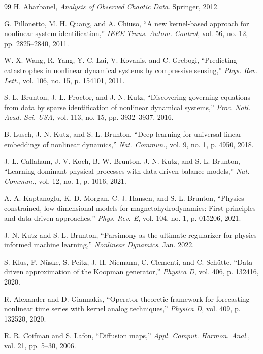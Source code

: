 \documentclass[11pt,a4paper]{article}
\begin{document}
\begin{thebibliography}{99}
H. Abarbanel, \textit{Analysis of Observed Chaotic Data}. Springer, 2012.

G. Pillonetto, M. H. Quang, and A. Chiuso, ``A new kernel-based approach for nonlinear system identification,'' \textit{IEEE Trans. Autom. Control}, vol. 56, no. 12, pp. 2825--2840, 2011.

W.-X. Wang, R. Yang, Y.-C. Lai, V. Kovanis, and C. Grebogi, ``Predicting catastrophes in nonlinear dynamical systems by compressive sensing,'' \textit{Phys. Rev. Lett.}, vol. 106, no. 15, p. 154101, 2011.

S. L. Brunton, J. L. Proctor, and J. N. Kutz, ``Discovering governing equations from data by sparse identification of nonlinear dynamical systems,'' \textit{Proc. Natl. Acad. Sci. USA}, vol. 113, no. 15, pp. 3932--3937, 2016.

B. Lusch, J. N. Kutz, and S. L. Brunton, ``Deep learning for universal linear embeddings of nonlinear dynamics,'' \textit{Nat. Commun.}, vol. 9, no. 1, p. 4950, 2018.

J. L. Callaham, J. V. Koch, B. W. Brunton, J. N. Kutz, and S. L. Brunton, ``Learning dominant physical processes with data-driven balance models,'' \textit{Nat. Commun.}, vol. 12, no. 1, p. 1016, 2021.

A. A. Kaptanoglu, K. D. Morgan, C. J. Hansen, and S. L. Brunton, ``Physics-constrained, low-dimensional models for magnetohydrodynamics: First-principles and data-driven approaches,'' \textit{Phys. Rev. E}, vol. 104, no. 1, p. 015206, 2021.

J. N. Kutz and S. L. Brunton, ``Parsimony as the ultimate regularizer for physics-informed machine learning,'' \textit{Nonlinear Dynamics}, Jan. 2022.

S. Klus, F. N\"{u}ske, S. Peitz, J.-H. Niemann, C. Clementi, and C. Sch\"{u}tte, ``Data-driven approximation of the Koopman generator,'' \textit{Physica D}, vol. 406, p. 132416, 2020.

R. Alexander and D. Giannakis, ``Operator-theoretic framework for forecasting nonlinear time series with kernel analog techniques,'' \textit{Physica D}, vol. 409, p. 132520, 2020.

R. R. Coifman and S. Lafon, ``Diffusion maps,'' \textit{Appl. Comput. Harmon. Anal.}, vol. 21, pp. 5--30, 2006.


\end{thebibliography}
\end{document}
